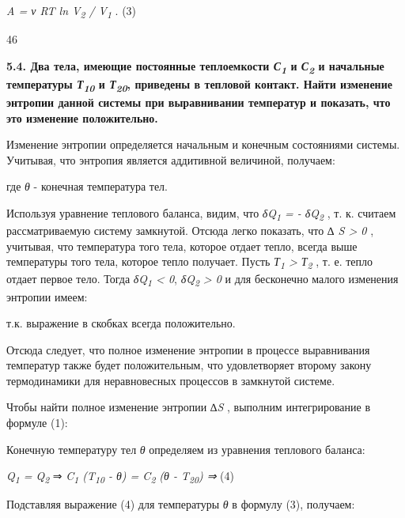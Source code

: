 \emph{A = ν RT ln V\textsubscript{2} / V\textsubscript{1}} . (3)

46

\textbf{5.4. Два тела, имеющие постоянные теплоемкости
\emph{С\textsubscript{1}} и \emph{С\textsubscript{2}} и начальные
температуры \emph{Т\textsubscript{10}} и \emph{Т\textsubscript{20}},
приведены в тепловой контакт. Найти изменение энтропии данной системы
при выравнивании температур и показать, что это изменение положительно.}

\solving{}

Изменение энтропии определяется начальным и конечным состояниями
системы. Учитывая, что энтропия является аддитивной величиной, получаем:


где \emph{θ} - конечная температура тел.

Используя уравнение теплового баланса, видим, что
\emph{δQ\textsubscript{1} = - δQ\textsubscript{2}} , т. к. считаем
рассматриваемую систему замкнутой. Отсюда легко показать, что \emph{∆ S
\textgreater{} 0} , учитывая, что температура того тела, которое отдает
тепло, всегда выше температуры того тела, которое тепло получает. Пусть
\emph{Т\textsubscript{1} \textgreater{} Т\textsubscript{2}} , т. е.
тепло отдает первое тело. Тогда \emph{δQ\textsubscript{1} \textless{}
0}, \emph{δQ\textsubscript{2} \textgreater{} 0} и для бесконечно малого
изменения энтропии имеем:


т.к. выражение в скобках всегда положительно.

Отсюда следует, что полное изменение энтропии в процессе выравнивания
температур также будет положительным, что удовлетворяет второму закону
термодинамики для неравновесных процессов в замкнутой системе.

Чтобы найти полное изменение энтропии \emph{∆S} , выполним
интегрирование в формуле (1):


Конечную температуру тел \emph{θ} определяем из уравнения теплового
баланса:

\emph{Q\textsubscript{1} = Q\textsubscript{2}} ⇒
\emph{C\textsubscript{1} (T\textsubscript{10} - θ) = C\textsubscript{2}
(θ - T\textsubscript{20}) ⇒} %
(4)

Подставляя выражение (4) для температуры \emph{θ} в формулу (3),
получаем:

